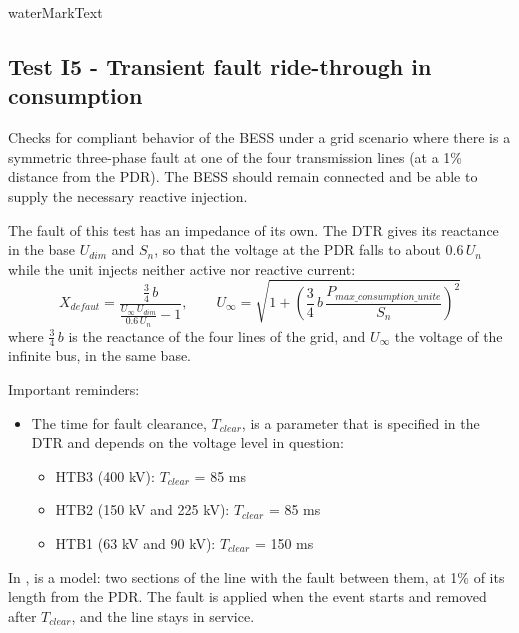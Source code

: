     {{ waterMarkText }}

    \renewcommand{\DTRPcs}{ThreePhaseFault} %
    \renewcommand{\PCSname}{PCS_RTE-I16z3}
    \renewcommand{\OCname}{TransientImpedantConsumption}


    \subsection{Test I5 - Transient fault ride-through in consumption}

    Checks for compliant behavior of the BESS under a grid scenario where there
    is a symmetric three-phase fault at one of the four transmission lines
    (at a 1\% distance from the PDR). The BESS should remain connected and
    be able to supply the necessary reactive injection.

    The fault of this test has an impedance of its own. The DTR gives its reactance
    in the base $U_{dim}$ and $S_n$, so that the voltage at the PDR falls to
    about $0.6\,U_n$ while the unit injects neither active nor reactive current:
    \[
        X_{defaut} = \frac{\frac{3}{4}\,b}{\frac{U_\infty\,U_{dim}}{0.6\,U_n} - 1},
        \qquad
        U_\infty = \sqrt{1 + \left(\frac{3}{4}\,b\,\frac{P_{max\_consumption\_unite}}{S_n}\right)^2}
    \]
    where $\frac{3}{4}\,b$ is the reactance of the four lines of the grid, and
    $U_\infty$ the voltage of the infinite bus, in the same base.

    \GridCircuitZthree

    \noindent Important reminders:
    \begin{itemize}
        \item The time for fault clearance, $T_{clear}$, is a parameter that
        is specified in the DTR and depends on the voltage level in
        question:
        \begin{itemize}
            \item HTB3 (400 kV): $T_{clear}$ = 85 ms
            \item HTB2 (150 kV and 225 kV): $T_{clear}$ = 85 ms
            \item HTB1 (63 kV and 90 kV): $T_{clear}$ = 150 ms
        \end{itemize}
    \end{itemize}

    In \Dynawo{},  is a  model: two sections of the
    line with the fault between them, at 1\% of its length from the PDR. The
    fault is applied when the event starts and removed after $T_{clear}$, and the
    line stays in service.

